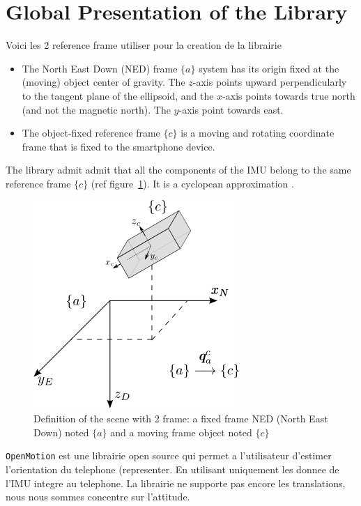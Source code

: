 
\section{Global Presentation of the Library}


Voici les 2 reference frame utiliser pour la creation de la librairie

\begin{itemize}
\item The North East Down (NED) frame $\{a\}$ system has its origin fixed at the (moving) object center of gravity. The $z$-axis points upward perpendicularly to the tangent plane of the ellipsoid, and the $x$-axis points towards true north (and not the magnetic north). The $y$-axis point towards east.

\vspace{0.1cm}

\item The object-fixed reference frame $\{c\}$ is a moving and rotating coordinate frame that is fixed to the smartphone device. 
\end{itemize}

The library admit admit that all the components of the IMU belong to the same reference frame $\{c\}$ (ref figure~\ref{Schema_situation}). It is a cyclopean approximation \cite{ouarti2008multimodal} .

\begin{figure}
\centering
\includegraphics[scale=0.65]{images/Schema_situation.png}
\caption{Definition of the scene with 2 frame:  a fixed frame NED (North East Down) noted $\{a\}$ and a moving frame object noted $\{c\}$}
\label{Schema_situation}
\end{figure}

\texttt{OpenMotion} est une librairie open source qui permet a l'utilisateur d'estimer l'orientation du telephone (representer. En utilisant uniquement les donnee de l'IMU integre au telephone. La librairie ne supporte pas encore les translations, nous nous sommes concentre sur l'attitude. 

